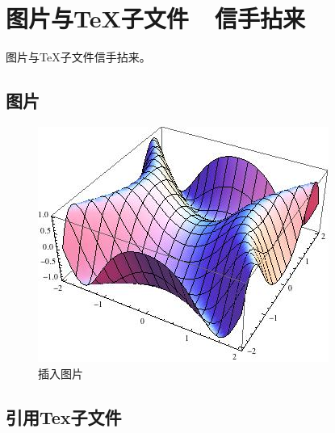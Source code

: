 
\section{图片与TeX子文件\ \ 信手拈来}

图片与TeX子文件信手拈来。

\subsection{图片}

\begin{figure}
    \centering
    \includegraphics[scale=0.4]{include_picture/picture.jpg}
    \caption{插入图片}
\end{figure}

\subsection{引用Tex子文件}




